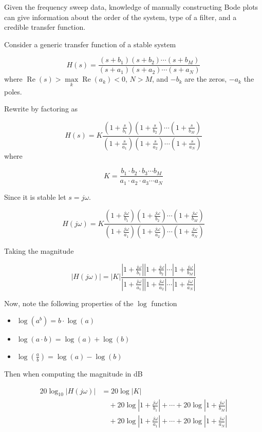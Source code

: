\documentclass{article}
\begin{document}
Given the frequency sweep data, knowledge of manually constructing Bode plots can give information about the order of the system, type of a filter, and a credible transfer function.

Consider a generic transfer function of a stable system

\[
H(s)=\frac{\left(s+b_{1}\right)\left(s+b_{2}\right) \cdots\left(s+b_{M}\right)}{\left(s+a_{1}\right)\left(s+a_{2}\right) \cdots\left(s+a_{N}\right)}
\]
where $\operatorname{Re}(s)>\max\limits_k \operatorname{Re}(a_k) < 0$, $N>M$, and  $-b_{k}$ are the zeros, $-a_{k}$ the poles.

Rewrite by factoring as

\[
H(s)=K \frac{\left(1+\frac{s}{b_{1}}\right)\left(1+\frac{s}{b_{2}}\right)\cdots\left(1+\frac{s}{b_{M}}\right)}{\left(1+\frac{s}{a_{1}}\right)\left(1+\frac{s}{a_{2}}\right)\cdots \left(1+\frac{s}{a_{N}}\right)}
\]
where

\[
K = \frac{b_1\cdot b_2\cdot b_3 \cdots b_M}{a_1\cdot a_2\cdot a_3 \cdots a_N}
\]

Since it is stable let $s=j\omega$.

\[
H(j\omega)=K \frac{\left(1+\frac{j\omega}{b_{1}}\right)\left(1+\frac{j\omega}{b_{2}}\right)\cdots\left(1+\frac{j\omega}{b_{M}}\right)}{\left(1+\frac{j\omega}{a_{1}}\right)\left(1+\frac{j\omega}{a_{2}}\right)\cdots \left(1+\frac{j\omega}{a_{N}}\right)}
\]

Taking the magnitude

\[
\left|H(j\omega)\right|=\left|K\right| \frac{\left|1+\frac{j\omega}{b_{1}}\right|\left|1+\frac{j\omega}{b_{2}}\right|\cdots\left|1+\frac{j\omega}{b_{M}}\right|}{\left|1+\frac{j\omega}{a_{1}}\right|\left|1+\frac{j\omega}{a_{2}}\right|\cdots \left|1+\frac{j\omega}{a_{N}}\right|}
\]

Now, note the following properties of the $\log$ function

\begin{itemize}
\item $\log\left(a^b\right) = b\cdot \log(a)$
\item $\log(a\cdot b) = \log(a) + \log(b)$
\item $\log\left(\frac{a}{b}\right) = \log(a) - \log(b)$
\end{itemize}

Then when computing the magnitude in dB

\begin{align*}
  20\log_{10} \left|H(j\omega)\right| &= 20\log|K|\\
  &\quad + 20\log\left|1+\frac{j\omega}{b_{1}}\right| + \cdots + 20\log\left|1+\frac{j\omega}{b_{M}}\right|\\
  &\quad + 20\log\left|1+\frac{j\omega}{a_{1}}\right| + \cdots + 20\log\left|1+\frac{j\omega}{a_{N}}\right|
\end{align*}
\end{document}
